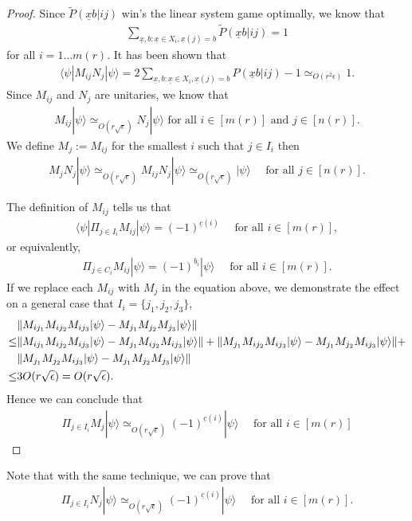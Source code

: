 \documentclass[11pt,letterpaper]{article}
\newcommand{\ket}[1]{|#1\rangle}
\newcommand{\bra}[1]{\langle#1|}
\DeclarePairedDelimiter{\norm}{\lVert}{\rVert}
\newcommand{\1}{\mathbb{1}}
\newcommand{\nr}{n(r)}
\newcommand{\mr}{m(r)}
\newcommand{\ux}{\underline{x}}
\newcommand{\uc}{\underline{c}}
\newcommand{\pr}[2]{P(#1|#2)}
\newcommand{\tpr}[2]{\tilde{P}(#1|#2)}
\newcommand{\ep}{\epsilon}
\newcommand{\se}{\sqrt{\epsilon}}
\newcommand{\appd}[1]{\simeq_{#1}}
\theoremstyle{definition}
\begin{document}
\begin{proof}
Since $\tpr{\ux b}{ij}$ win's the linear system game optimally, we know that 
\begin{align}
\sum_{\ux,b: \ux \in X_i, \ux(j) = b} \tpr{\ux b}{ij} = 1
\end{align}
for all $i = 1 \dots \mr$.
It has been shown \cite{slofstra2017} that 
\begin{align}
	\bra{\psi} M_{ij} N_j \ket{\psi} = 2 \sum_{\ux,b: \ux \in X_i, \ux(j) = b} \pr{\ux b}{ij} -1 \appd{O(r^2 \ep)} 1.
\end{align}
Since $M_{ij}$ and $N_j$ are unitaries, we know that
\begin{align}
	M_{ij} \ket{\psi} \appd{O(r\se)} N_j \ket{\psi} \text{ for all } i \in [\mr] \text{ and } j \in [\nr].
\end{align}
We define $M_j := M_{ij}$ for the smallest $i$ such that $ j \in I_i$ then 
\begin{align}
	M_j N_j \ket{\psi} \appd{O(r\se)} M_{ij}N_j\ket{\psi} \appd{O(r\se)} \ket{\psi} \quad \text{ for all } j \in [\nr].
\end{align}

The definition of $M_{ij}$ tells us that 
\begin{align}
	\bra{\psi} \Pi_{j \in I_i} M_{ij} \ket{\psi} = (-1)^{\uc(i)}\quad	\text{ for all } i \in [\mr],
\end{align}
or equivalently,
\begin{align}
	\Pi_{j \in C_i} M_{ij} \ket{\psi} = (-1)^{b_i} \ket{\psi}\quad\text{ for all } i \in [\mr].
\end{align}	
If we replace each $M_{ij}$ with $M_j$ in the equation above, we demonstrate the effect on a
general case that $I_i = \{j_1, j_2, j_3\}$,
\begin{align}
	&\norm{ M_{ij_1}M_{ij_2}M_{ij_3} \ket{\psi} - M_{j_1}M_{j_2}M_{j_3} \ket{\psi}}\\
	\leq & \norm{M_{ij_1}M_{ij_2}M_{ij_3} \ket{\psi} - M_{j_1}M_{ij_2}M_{ij_3} \ket{\psi}}+
	\norm{M_{j_1}M_{ij_2}M_{ij_3} \ket{\psi} - M_{j_1}M_{j_2}M_{ij_3} \ket{\psi}} +\\
	&\norm{M_{j_1}M_{j_2}M_{ij_3} \ket{\psi} - M_{j_1}M_{j_2}M_{j_3} \ket{\psi}}\\
	\leq &3O(r\se) = O(r\se).
\end{align}
Hence we can conclude that 
\begin{align}
	\Pi_{j \in I_i} M_j \ket{\psi} \appd{O(r\se)} (-1)^{\uc(i)}\ket{\psi} \quad \text{ for all } i \in [\mr]
\end{align}
\end{proof}
Note that with the same technique, we can prove that 
\begin{align}
	\Pi_{j \in I_i} N_j \ket{\psi} \appd{O(r\se)} (-1)^{\uc(i)}\ket{\psi} \quad \text{ for all } i \in [\mr].
\end{align}
\end{document}
